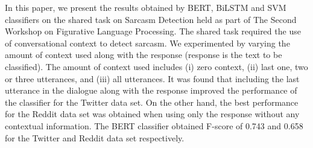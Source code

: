 In this paper, we present the results obtained by BERT, BiLSTM and SVM classifiers on the shared task on Sarcasm Detection held as part of The Second Workshop on Figurative Language Processing. The shared task required the use of conversational context to detect sarcasm. We experimented by varying the amount of context used along with the response (response is the text to be classified). The amount of context used includes (i) zero context, (ii) last one, two or three utterances, and (iii) all utterances. It was found that including the last utterance in the dialogue along with the response improved the performance of the classifier for the Twitter data set. On the other hand, the best performance for the Reddit data set was obtained when using only the response without any contextual information. The BERT classifier obtained F-score of 0.743 and 0.658 for the Twitter and Reddit data set respectively.
